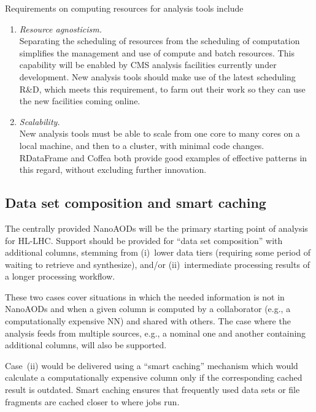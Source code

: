 Requirements on computing resources for analysis tools include

\begin{enumerate}
\item{} \label{item:agnostic} {\em Resource agnosticism.}\\
Separating the scheduling of resources from the scheduling of computation simplifies the management and use of compute and batch resources. This capability will be enabled by CMS analysis facilities currently under development. New analysis tools should make use of the latest scheduling R\&D, which meets this requirement, to farm out their work so they can use the new facilities coming online.

\item{} \label{item:scalability} {\em Scalability.}\\
New analysis tools must be able to scale from one core to many cores on a local machine, and then to a cluster, with minimal code changes. RDataFrame and Coffea both provide good examples of effective patterns in this regard, without excluding further innovation. 
\end{enumerate}

\subsection{Data set composition and smart caching}
\label{sec:smart-caching}

The centrally provided NanoAODs will be the primary starting point of analysis for \gls{HL-LHC}. Support should be provided for ``data set composition'' with additional columns, stemming from (i)~lower data tiers (requiring some period of waiting to retrieve and synthesize), and/or (ii)~intermediate processing results of a longer processing workflow. 

These two cases cover situations in which the needed information is not in NanoAODs and when a given column is computed by a collaborator (e.g., a computationally expensive \gls{NN}) and shared with others. The case where the analysis feeds from multiple sources, e.g., a nominal one and another containing additional columns, will also be supported. 

Case~(ii) would be delivered using a ``smart caching'' mechanism which would calculate a computationally expensive column only if the corresponding cached result is outdated. Smart caching ensures that frequently used data sets or file fragments are cached closer to where jobs run.

